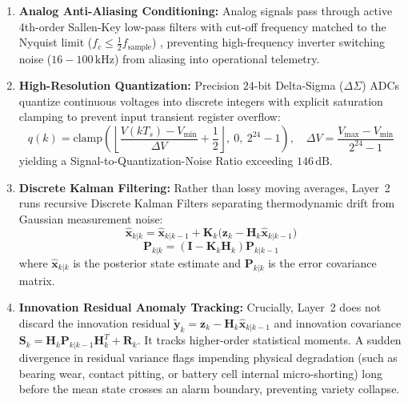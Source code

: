 \begin{enumerate}
    \item \textbf{Analog Anti-Aliasing Conditioning:} Analog signals pass through active 4th-order Sallen-Key low-pass filters with cut-off frequency matched to the Nyquist limit ($f_c \le \frac{1}{2} f_{\mathrm{sample}}$) \parencite{nyquist1928, shannon1948}, preventing high-frequency inverter switching noise ($16 - 100\,\mathrm{kHz}$) from aliasing into operational telemetry.
    \item \textbf{High-Resolution Quantization:} Precision $24$-bit Delta-Sigma ($\Delta\Sigma$) ADCs quantize continuous voltages into discrete integers with explicit saturation clamping to prevent input transient register overflow:
    \begin{equation}
    q(k) = \mathrm{clamp}\left( \left\lfloor \frac{V(k T_s) - V_{\min}}{\Delta V} + \frac{1}{2} \right\rfloor, \ 0, \ 2^{24}-1 \right), \quad \Delta V = \frac{V_{\max} - V_{\min}}{2^{24} - 1}
    \label{eq:l2_quant_adcs}
    \end{equation}
    yielding a Signal-to-Quantization-Noise Ratio exceeding $146\,\mathrm{dB}$.
    \item \textbf{Discrete Kalman Filtering:} Rather than lossy moving averages, Layer~2 runs recursive Discrete Kalman Filters \parencite{kalman1960} separating thermodynamic drift from Gaussian measurement noise:
    \begin{equation}
    \hat{\mathbf{x}}_{k|k} = \hat{\mathbf{x}}_{k|k-1} + \mathbf{K}_k \big(\mathbf{z}_k - \mathbf{H}_k \hat{\mathbf{x}}_{k|k-1}\big)
    \label{eq:l2_kalman_state}
    \end{equation}
    \begin{equation}
    \mathbf{P}_{k|k} = (\mathbf{I} - \mathbf{K}_k \mathbf{H}_k) \mathbf{P}_{k|k-1}
    \label{eq:l2_kalman_cov}
    \end{equation}
    where $\hat{\mathbf{x}}_{k|k}$ is the posterior state estimate and $\mathbf{P}_{k|k}$ is the error covariance matrix.
    \item \textbf{Innovation Residual Anomaly Tracking:} Crucially, Layer~2 does not discard the innovation residual $\tilde{\mathbf{y}}_k = \mathbf{z}_k - \mathbf{H}_k\hat{\mathbf{x}}_{k|k-1}$ and innovation covariance $\mathbf{S}_k = \mathbf{H}_k \mathbf{P}_{k|k-1} \mathbf{H}_k^T + \mathbf{R}_k$. It tracks higher-order statistical moments. A sudden divergence in residual variance flags impending physical degradation (such as bearing wear, contact pitting, or battery cell internal micro-shorting) long before the mean state crosses an alarm boundary, preventing variety collapse.

\end{enumerate}
